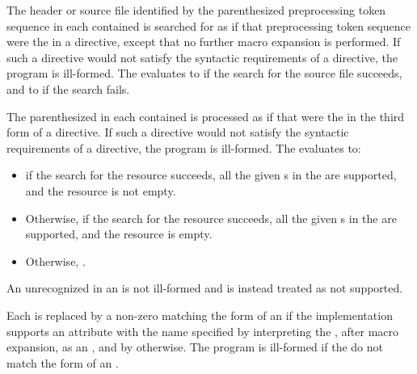 \pnum
The header or source file identified by
the parenthesized preprocessing token sequence
in each contained 
is searched for as if that preprocessing token sequence
were the  in a  directive,
except that no further macro expansion is performed.
If such a directive would not satisfy the syntactic requirements
of a  directive, the program is ill-formed.
The  evaluates
to  if the search for the source file succeeds, and
to  if the search fails.

\pnum
The parenthesized  in each contained
 is processed as if that
 were the  in the
third form of a  directive.
If such a directive would not satisfy the syntactic requirements of a
 directive, the program is ill-formed.
The  evaluates to:

\begin{itemize}
\item
{} if the search for the resource succeeds,
all the given s in the 
are supported, and the resource is not empty.

\item
Otherwise,  if the search for the resource succeeds,
all the given s in the 
are supported, and the resource is empty.

\item
Otherwise, .
\end{itemize}

\begin{note}
An unrecognized  in an 
is not ill-formed and is instead treated as not supported.
\end{note}

\pnum
Each  is replaced by
a non-zero 
matching the form of an 
if the implementation supports an attribute
with the name specified by interpreting
the , after macro expansion,
as an ,
and by  otherwise.
The program is ill-formed if the 
do not match the form of an .

